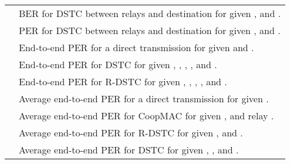 \documentclass[peerreview,draftcls,onecolumn,12pt,a4paper]{IEEEtran}
\begin{document}
\begin{table}[h!]
\begin{minipage}[b]{1\linewidth}
\begin{tabular}{c||l}
\hline   & BER for DSTC
between relays
and destination for given ,  and . \\
  & PER for DSTC between relays and destination for given ,  and . \\
\hline
 & End-to-end PER for a direct transmission for given  and . \\
\hline
  & End-to-end PER for DSTC for given , , , ,  and . \\
\hline
  & End-to-end PER for R-DSTC for given , , , ,  and . \\
\hline
 & Average end-to-end PER for a direct transmission for given . \\
\hline  & Average end-to-end PER for
CoopMAC for given ,  and relay . \\ \hline
 & Average end-to-end PER for R-DSTC for given ,  and . \\
\hline
  & Average end-to-end PER for DSTC for given , ,  and . \\
\hline

\end{tabular}
\end{minipage} \\
\end{table}
\end{document}
